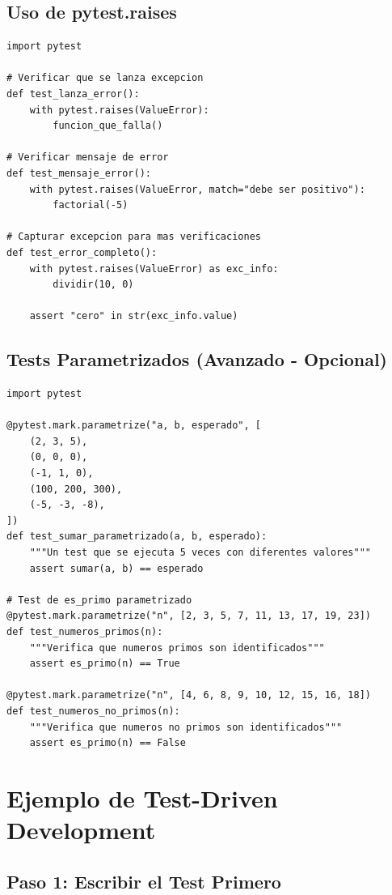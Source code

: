 \documentclass[12pt,a4paper]{article}
\begin{document}
\subsection{Uso de pytest.raises}

\begin{lstlisting}[caption=Verificar excepciones]
import pytest

# Verificar que se lanza excepcion
def test_lanza_error():
    with pytest.raises(ValueError):
        funcion_que_falla()

# Verificar mensaje de error
def test_mensaje_error():
    with pytest.raises(ValueError, match="debe ser positivo"):
        factorial(-5)

# Capturar excepcion para mas verificaciones
def test_error_completo():
    with pytest.raises(ValueError) as exc_info:
        dividir(10, 0)
    
    assert "cero" in str(exc_info.value)
\end{lstlisting}

\subsection{Tests Parametrizados (Avanzado - Opcional)}

\begin{lstlisting}[caption=Tests parametrizados con pytest]
import pytest

@pytest.mark.parametrize("a, b, esperado", [
    (2, 3, 5),
    (0, 0, 0),
    (-1, 1, 0),
    (100, 200, 300),
    (-5, -3, -8),
])
def test_sumar_parametrizado(a, b, esperado):
    """Un test que se ejecuta 5 veces con diferentes valores"""
    assert sumar(a, b) == esperado

# Test de es_primo parametrizado
@pytest.mark.parametrize("n", [2, 3, 5, 7, 11, 13, 17, 19, 23])
def test_numeros_primos(n):
    """Verifica que numeros primos son identificados"""
    assert es_primo(n) == True

@pytest.mark.parametrize("n", [4, 6, 8, 9, 10, 12, 15, 16, 18])
def test_numeros_no_primos(n):
    """Verifica que numeros no primos son identificados"""
    assert es_primo(n) == False
\end{lstlisting}

\section{Ejemplo de Test-Driven Development}

\subsection{Paso 1: Escribir el Test Primero}
\end{document}
